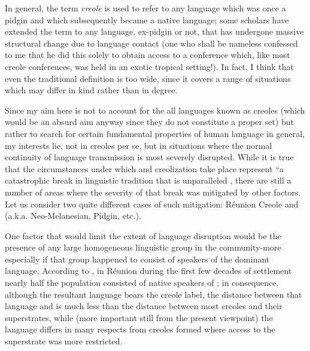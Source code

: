 In general, the term \textit{creole} is used to refer to any language which was once a pidgin and which subsequently became a native language;  some scholars have extended the term to any language, ex-pidgin or not, that has undergone massive structural change due to language contact (one who shall be nameless confessed to me that he did this solely to obtain access to a conference which, like most creole conferences, was held in an exotic tropical setting!). In fact, I think that even the traditional definition is too wide, since it covers a range of situations which may differ in kind rather than in degree.

Since my aim here is not to account for the  all lan\-guages known as creoles (which would be an absurd aim anyway since they do not constitute a proper set) but rather to search for certain fundamental properties of human language in general, my interests lie, not in creoles per se, but in situations where the normal continuity of language transmission is most severely disrupted. While it is true that the circumstances under which  and creolization take place represent ``a catastrophic break in linguistic tradition that is unparalleled \citep[24]{Sankoff1979}, there are still a number of areas where the severity of that break was mitigated by other factors. Let us consider two quite different cases of such mitigation: Réunion Creole and  (a.k.a. Neo-Melanesian,  Pidgin, etc.).

One factor that would limit the extent of language disruption would be the presence of any large homogeneous linguistic group in the community-more especially if that group happened to consist of speakers of the dominant language. According to \citet{Chaudenson1974}, in Réunion during the first few decades of settlement nearly half the population consisted of native speakers of ; in conse\-quence, although the resultant language bears the creole label, the distance between that language and  is much less than the distance between most creoles and their superstrates, while (more important still from the present viewpoint) the language differs in many respects from creoles formed where access to the superstrate was more restricted.

